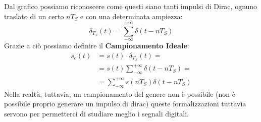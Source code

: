     \begin{center}
\end{center}

Dal grafico possiamo riconoscere come questi siano tanti impulsi di Dirac, ognuno traslato di un certo $nT_S$ e 
con una determinata ampiezza: 
\begin{equation}
    \delta_{T_S} (t) = \sum_{-\infty}^{+\infty} \delta (t - nT_S)
\end{equation}
Grazie a ciò possiamo definire il \textbf{Campionamento Ideale}:
\begin{align*}
    s_c(t) &= s(t) \cdot \delta_{T_S} (t) =\\ 
           &= s(t)\sum_{-\infty}^{+\infty} \delta (t - nT_S) = \\
           &= \sum_{-\infty}^{+\infty} s(nT_S) \delta (t - nT_S)
\end{align*}
Nella realtà, tuttavia, un campionamento del genere non è possibile (non è possibile proprio generare un impulso di dirac)
queste formalizzazioni tuttavia servono per permetterci di studiare meglio i segnali digitali.
